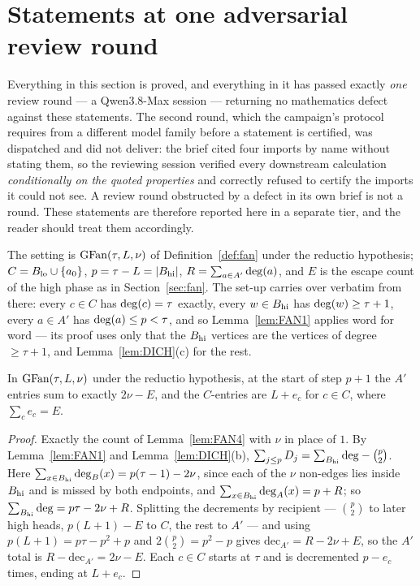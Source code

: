 \section{Statements at one adversarial review round}\label{sec:oneround}

Everything in this section is proved, and everything in it has passed exactly \emph{one}
review round --- a Qwen3.8-Max session ---
returning no mathematics defect against these statements. The second round, which the
campaign's protocol requires from a different model family before a statement is certified,
was dispatched and did not deliver: the brief cited four imports by name without stating
them, so the reviewing session verified every downstream calculation \emph{conditionally on
the quoted properties} and correctly refused to certify the imports it could not see. A
review round obstructed by a defect in its own brief is not a round. These statements are
therefore reported here in a separate tier, and the reader should treat them accordingly.

The setting is $\mathrm{GFan}(\tau,L,\nu)$ of Definition~\ref{def:fan} under the reductio
hypothesis; $C = B_{\mathrm{lo}} \cup \{a_0\}$, $p = \tau - L = |B_{\mathrm{hi}}|$, $R = \sum_{a \in A'}\mathrm{deg}(a)$,
and $E$ is the escape count of the high phase as in Section~\ref{sec:fan}. The set-up
carries over verbatim from there: every $c \in C$ has $\mathrm{deg}(c) = \tau$ exactly, every
$w \in B_{\mathrm{hi}}$ has $\mathrm{deg}(w) \ge \tau+1$, every $a \in A'$ has $\mathrm{deg}(a) \le p < \tau$, and so
Lemma~\ref{lem:FAN1} applies word for word --- its proof uses only that the $B_{\mathrm{hi}}$ vertices
are the vertices of degree $\ge \tau+1$, and Lemma~\ref{lem:DICH}(c) for the rest.

\begin{lemma}\label{lem:FAN4p}
In $\mathrm{GFan}(\tau,L,\nu)$ under the reductio hypothesis, at the start of step $p+1$ the $A'$
entries sum to exactly $2\nu - E$, and the $C$-entries are $L + e_c$ for $c \in C$, where
$\sum_c e_c = E$.
\end{lemma}

\begin{proof}
Exactly the count of Lemma~\ref{lem:FAN4} with $\nu$ in place of $1$. By
Lemma~\ref{lem:FAN1} and Lemma~\ref{lem:DICH}(b),
$\sum_{j\le p} D_j = \sum_{B_{\mathrm{hi}}}\mathrm{deg} - \binom{p}{2}$. Here
$\sum_{x \in B_{\mathrm{hi}}}\mathrm{deg}_B(x) = p(\tau-1) - 2\nu$, since each of the $\nu$ non-edges lies
inside $B_{\mathrm{hi}}$ and is missed by both endpoints, and $\sum_{x\in B_{\mathrm{hi}}}\mathrm{deg}_A(x) = p + R$; so
$\sum_{B_{\mathrm{hi}}}\mathrm{deg} = p\tau - 2\nu + R$. Splitting the decrements by recipient ---
$\binom{p}{2}$ to later high heads, $p(L+1) - E$ to $C$, the rest to $A'$ --- and using
$p(L+1) = p\tau - p^2 + p$ and $2\binom{p}{2} = p^2 - p$ gives
$\mathrm{dec}_{A'} = R - 2\nu + E$, so the $A'$ total is $R - \mathrm{dec}_{A'} = 2\nu - E$.
Each $c \in C$ starts at $\tau$ and is decremented $p - e_c$ times, ending at $L + e_c$.
\end{proof}

